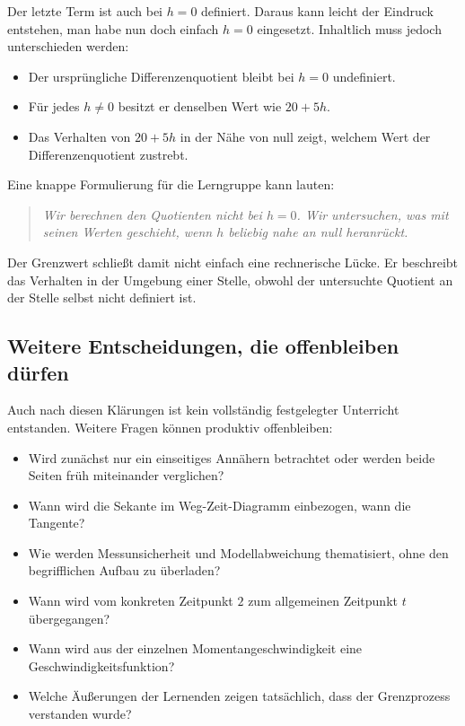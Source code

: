 \documentclass[11pt,a4paper]{article}
\newenvironment{leitgedanke}
  {\begin{quote}\color{dunkelblau}\itshape}
  {\end{quote}}
\begin{document}
Der letzte Term ist auch bei $h=0$ definiert. Daraus kann leicht der Eindruck
entstehen, man habe nun doch einfach $h=0$ eingesetzt. Inhaltlich muss jedoch
unterschieden werden:

\begin{itemize}
  \item Der ursprüngliche Differenzenquotient bleibt bei $h=0$ undefiniert.
  \item Für jedes $h\neq0$ besitzt er denselben Wert wie $20+5h$.
  \item Das Verhalten von $20+5h$ in der Nähe von null zeigt, welchem Wert der
        Differenzenquotient zustrebt.
\end{itemize}

Eine knappe Formulierung für die Lerngruppe kann lauten:

\begin{leitgedanke}
Wir berechnen den Quotienten nicht bei $h=0$. Wir untersuchen, was mit seinen
Werten geschieht, wenn $h$ beliebig nahe an null heranrückt.
\end{leitgedanke}

Der Grenzwert schließt damit nicht einfach eine rechnerische Lücke. Er beschreibt
das Verhalten in der Umgebung einer Stelle, obwohl der untersuchte Quotient an
der Stelle selbst nicht definiert ist.


\subsection{Weitere Entscheidungen, die offenbleiben dürfen}

Auch nach diesen Klärungen ist kein vollständig festgelegter Unterricht
entstanden. Weitere Fragen können produktiv offenbleiben:

\begin{itemize}
  \item Wird zunächst nur ein einseitiges Annähern betrachtet oder werden beide
        Seiten früh miteinander verglichen?
  \item Wann wird die Sekante im Weg-Zeit-Diagramm einbezogen, wann die Tangente?
  \item Wie werden Messunsicherheit und Modellabweichung thematisiert, ohne den
        begrifflichen Aufbau zu überladen?
  \item Wann wird vom konkreten Zeitpunkt $2$ zum allgemeinen Zeitpunkt $t$
        übergegangen?
  \item Wann wird aus der einzelnen Momentangeschwindigkeit eine
        Geschwindigkeitsfunktion?
  \item Welche Äußerungen der Lernenden zeigen tatsächlich, dass der
        Grenzprozess verstanden wurde?
\end{itemize}
\end{document}
